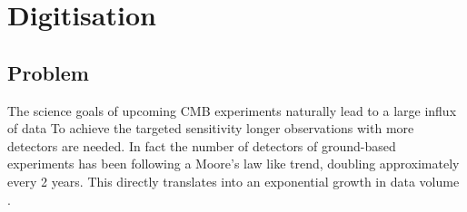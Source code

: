 \documentclass[apj]{emulateapj}
\begin{document}






\section{Digitisation}
\label{sec:dig}

\subsection{Problem}
\label{subsec:problem}


The science goals of upcoming CMB experiments naturally lead to a large influx of data To achieve the targeted sensitivity longer observations with more detectors are needed. In fact the number of detectors of ground-based experiments has been following a Moore's law like trend, doubling approximately every 2 years. This directly translates into an exponential growth in data volume \citep{s4sciencebook}. %
\end{document}
